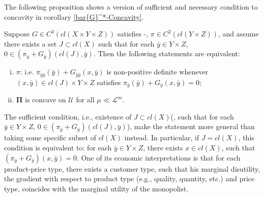 The following proposition shows a version of sufficient and necessary condition to concavity in corollary \ref{bar{G}^*-Concavity}.\medskip


\begin{proposition}\label{bar{G}^*-Concavity2}
	Suppose $G \in C^3(cl(X\times Y \times Z)
	)$ satisfies \Gzero-\Gsix,  $\pi \in C^2( cl( Y \times Z)
	)$, and assume there exists a set $J\subset cl(X)$ such that for each $\bar{y}\in Y\times Z$, $ 0\in ( \pi_{\bar{y}}+G_{\bar{y}})(cl(J), \bar{y})$.  Then the following statements are equivalent:
	
	\begin{enumerate}[(i)]
		\item {} $\pi$: i.e. $\pi_{\bar{y}\bar{y}}(\bar{y}) + G_{\bar{y}\bar{y}}(x, \bar{y})$ is non-positive definite whenever
		$(x, \bar{y}) \in cl(J)\times Y \times Z$ satisfies $\pi_{\bar{y}}(\bar{y})+ G_{\bar{y}}(x, \bar{y})=0$;
		\item $\pmb \Pi$ is concave on $\mathcal{U}$ for all $\mu\ll \mathcal{L}^m$.
	\end{enumerate}
\end{proposition}


\begin{remark}
	The sufficient condition, i.e., existence of $J \subset cl(X)$(, such that for each  $\bar{y}\in Y\times Z$, $ 0\in ( \pi_{\bar{y}}+G_{\bar{y}})(cl(J), \bar{y})$), make the statement more general than taking some specific subset of $cl(X)$ instead. In particular, if $J=cl(X)$, this condition is equivalent to: for each $\bar{y} \in Y\times Z$, there exists $x \in cl(X)$, such that $( \pi_{\bar{y}}+G_{\bar{y}})(x, \bar{y}) = 0$. One of its economic interpretations is that for each product-price type, there exists a customer type, such that his marginal disutility, the gradient with respect to product type (e.g., quality, quantity, etc.) and price type, coincides with the marginal utility of the monopolist. 
\end{remark}

